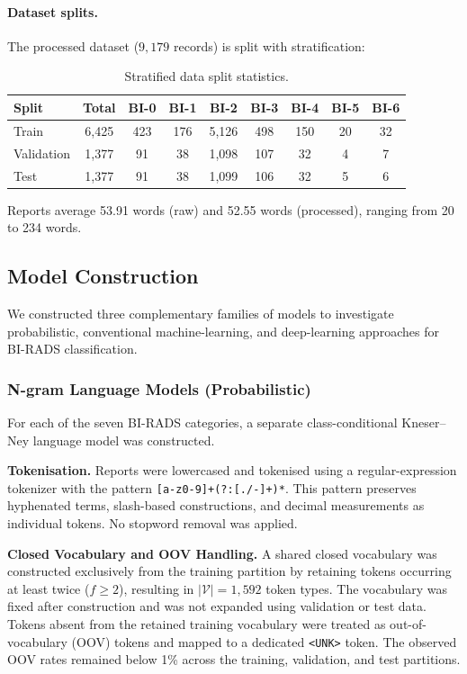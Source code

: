 \documentclass[11pt,a4paper]{article}
\begin{document}
\paragraph{Dataset splits.}
The processed dataset ($9{,}179$ records) is split with stratification:

\begin{table}[h!]
\centering
\caption{Stratified data split statistics.}
\label{tab:splits}
\begin{tabular}{lcccccccc}
\toprule
\textbf{Split} & \textbf{Total} &
  \textbf{BI-0} & \textbf{BI-1} & \textbf{BI-2} &
  \textbf{BI-3} & \textbf{BI-4} & \textbf{BI-5} & \textbf{BI-6} \\
\midrule
Train      & 6{,}425 & 423 & 176 & 5{,}126 & 498 & 150 & 20 & 32 \\
Validation & 1{,}377 & 91  & 38  & 1{,}098 & 107 & 32  & 4  & 7  \\
Test       & 1{,}377 & 91  & 38  & 1{,}099 & 106 & 32  & 5  & 6  \\
\bottomrule
\end{tabular}
\end{table}

Reports average 53.91 words (raw) and 52.55 words (processed), ranging from
20 to 234 words.

\subsection{Model Construction}
\label{sec:model_construction}

We constructed three complementary families of models to investigate probabilistic, conventional machine-learning, and deep-learning approaches for BI-RADS classification.

\subsubsection{N-gram Language Models (Probabilistic)}

For each of the seven BI-RADS categories, a separate class-conditional Kneser--Ney language model was constructed.

\textbf{Tokenisation.}
Reports were lowercased and tokenised using a regular-expression tokenizer with the pattern
\texttt{[a-z0-9]+(?:[./-]\allowbreak[a-z0-9]+)*}.
This pattern preserves hyphenated terms, slash-based constructions, and decimal measurements as individual tokens. No stopword removal was applied.

\textbf{Closed Vocabulary and OOV Handling.}
A shared closed vocabulary was constructed exclusively from the training partition by retaining tokens occurring at least twice ($f \geq 2$), resulting in $|\mathcal{V}| = 1{,}592$ token types. The vocabulary was fixed after construction and was not expanded using validation or test data. Tokens absent from the retained training vocabulary were treated as out-of-vocabulary (OOV) tokens and mapped to a dedicated \texttt{<UNK>} token. The observed OOV rates remained below  1\% across the training, validation, and test partitions.
\end{document}
